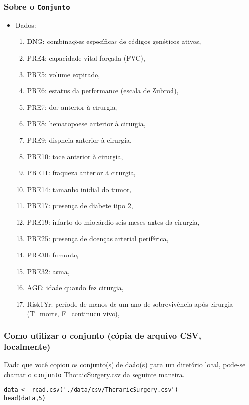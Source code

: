 \documentclass[11pt]{article}
\begin{document}
\subsubsection{Sobre o \texttt{Conjunto}}
\label{sec:orga5bae8f}
\begin{itemize}
\item Dados:
\begin{enumerate}
\item DNG: combinações específicas de códigos genéticos ativos,
\item PRE4: capacidade vital forçada (FVC),
\item PRE5: volume expirado,
\item PRE6: estatus da performance (escala de  Zubrod),
\item PRE7: dor anterior à cirurgia,
\item PRE8: hematopoese anterior à cirurgia,
\item PRE9: dispneia anterior à cirurgia,
\item PRE10: toce anterior à cirurgia,
\item PRE11: fraqueza anterior à cirurgia,
\item PRE14: tamanho inidial do tumor,
\item PRE17: presença de diabete tipo 2,
\item PRE19: infarto do miocárdio seis meses antes da cirurgia,
\item PRE25: presença de doenças arterial periférica,
\item PRE30: fumante,
\item PRE32: asma,
\item AGE: idade quando fez cirurgia,
\item Risk1Yr: período de menos de um ano de sobrevivência após cirurgia (T=morte, F=continuou vivo),
\end{enumerate}
\end{itemize}

\subsubsection{Como utilizar o conjunto (cópia de arquivo CSV, localmente)}
\label{sec:orgb1883f1}

Dado que você copiou os conjunto(s) de dado(s) para um diretório
local, pode-se chamar o \texttt{conjunto} \href{https://drive.google.com/file/d/13s1ZtCWotN\_VwQb07yTWEyBMmvO042At/view?usp=sharing}{ThoraicSurgery.csv} da seguinte maneira.

\begin{verbatim}
data <- read.csv('./data/csv/ThoraricSurgery.csv')
head(data,5)
\end{verbatim}
\end{document}
